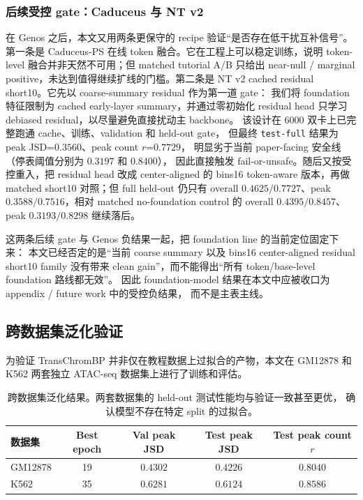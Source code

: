 \documentclass[11pt,a4paper]{ctexart}
\begin{document}
\subsubsection{后续受控 gate：Caduceus 与 NT v2}

在 Genos 之后，本文又用两条更保守的 recipe 验证“是否存在低干扰互补信号”。
第一条是 Caduceus-PS 在线 token 融合。它在工程上可以稳定训练，说明
token-level 融合并非天然不可用；但 matched tutorial A/B 只给出
near-null / marginal positive，未达到值得继续扩线的门槛。第二条是
NT v2 cached residual short10。它先以 coarse-summary residual 作为第一道 gate：
我们将 foundation 特征限制为 cached early-layer summary，并通过零初始化
residual head 只学习 debiased residual，以尽量避免直接扰动主 backbone。
该设计在 6000 双卡上已完整跑通 cache、训练、validation 和 held-out gate，
但最终 \texttt{test-full} 结果为 peak JSD=$0.3560$、peak count $r$=$0.7729$，
明显劣于当前 paper-facing 安全线（停表阈值分别为 $0.3197$ 和 $0.8400$），
因此直接触发 fail-or-unsafe。随后又按受控重入，把 residual head 改成
center-aligned 的 bins16 token-aware 版本，再做 matched short10 对照；但 full held-out
仍只有 overall $0.4625/0.7727$、peak $0.3588/0.7516$，相对 matched no-foundation
control 的 overall $0.4395/0.8457$、peak $0.3193/0.8298$ 继续落后。

这两条后续 gate 与 Genos 负结果一起，把 foundation line 的当前定位固定下来：
本文已经否定的是“当前 coarse summary 以及 bins16 center-aligned residual short10 family
没有带来 clean gain”，而不能得出“所有 token/base-level foundation 路线都无效”。
因此 foundation-model 结果在本文中应被收口为 appendix / future work 中的受控负结果，
而不是主表主线。

\subsection{跨数据集泛化验证}
\label{sec:generalization}

为验证 TransChromBP 并非仅在教程数据上过拟合的产物，本文在 GM12878 和 K562
两套独立 ATAC-seq 数据集上进行了训练和评估。

\begin{table}[H]
\centering
\caption{跨数据集泛化结果。两套数据集的 held-out 测试性能均与验证一致甚至更优，
确认模型不存在特定 split 的过拟合。}
\label{tab:generalization}
\begin{tabular}{lcccc}
\toprule
数据集 & Best epoch & Val peak JSD & Test peak JSD & Test peak count $r$ \\
\midrule
GM12878 & 19 & $0.4302$ & $0.4226$ & $0.8040$ \\
K562 & 35 & $0.6281$ & $0.6124$ & $0.8586$ \\
\bottomrule
\end{tabular}
\end{table}
\end{document}
